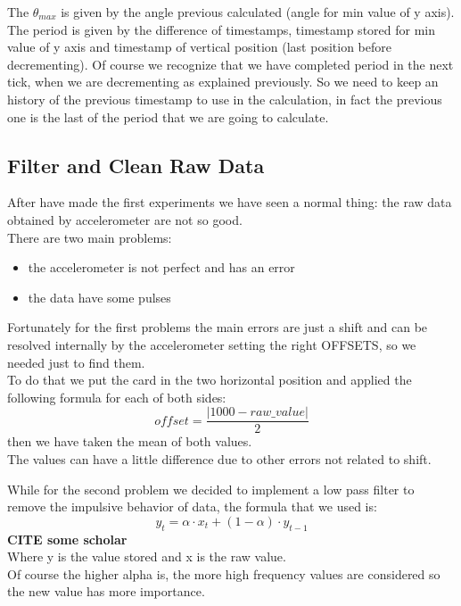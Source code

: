 The $\theta_{max}$ is given by the  angle previous calculated (angle for min value of y axis).\\
The period is given by the difference of timestamps, timestamp stored for min value of y axis and timestamp of vertical position (last position before decrementing).
Of course we recognize that we have completed period in the next tick, when we are decrementing as explained previously. So we need to keep an history of the previous timestamp to use in the calculation, in fact the previous one is the last of the period that we are going to calculate.

\subsection{Filter and Clean Raw Data}
After have made the first experiments we have seen a normal thing: the raw data obtained by accelerometer are not so good.\\
There are two main problems:
\begin{itemize}
	\item the accelerometer is not perfect and has an error
	\item the data have some pulses
\end{itemize} \par

Fortunately for the first problems the main errors are just a shift and can be resolved internally by the accelerometer setting the right OFFSETS, so we needed just to find them.\\
To do that we put the card in the two horizontal position and applied the following formula for each of both sides:
$$ offset = \frac{\left|1000-raw\_value\right|}{2}$$
then we have taken the mean of both values. \\
The values can have a little difference due to other errors not related to shift.\par

While for the second problem we decided to implement a low pass filter to remove the impulsive behavior of data, the formula that we used is:
$$ y_t = \alpha \cdot x_t + (1-\alpha) \cdot y_{t-1}$$
\textbf{CITE some scholar}\\
Where y is the value stored and x is the raw value.\\
Of course the higher alpha is, the more high frequency values are considered so the new value has more importance.

